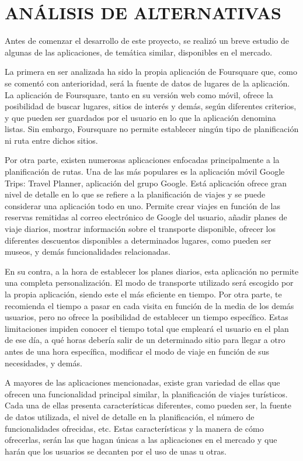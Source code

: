 \chapter[Análisis de alternativas]{
  \label{chp:analisisdealternativas}
  ANÁLISIS DE ALTERNATIVAS
}
\thispagestyle{numberingStyle}
\pagestyle{numberingStyle}



Antes de comenzar el desarrollo de este proyecto, se realizó un breve estudio de algunas de las aplicaciones, de temática similar, disponibles en el mercado. 

La primera en ser analizada ha sido la propia aplicación de Foursquare que, como se comentó con anterioridad, será la fuente de datos de lugares de la aplicación. La aplicación de Foursquare, tanto en su versión web como móvil, ofrece la posibilidad de buscar lugares, sitios de interés y demás, según diferentes criterios, y que pueden ser guardados por el usuario en lo que la aplicación denomina listas. Sin embargo, Foursquare no permite establecer ningún tipo de planificación ni ruta entre dichos sitios.

Por otra parte, existen numerosas aplicaciones enfocadas principalmente a la planificación de rutas. Una de las más populares es la aplicación móvil Google Trips: Travel Planner, aplicación del grupo Google. Está aplicación ofrece gran nivel de detalle en lo que se refiere a la planificación de viajes y se puede considerar una aplicación todo en uno. Permite crear viajes en función de las reservas remitidas al correo electrónico de Google del usuario, añadir planes de viaje diarios, mostrar información sobre el transporte disponible, ofrecer los diferentes descuentos disponibles a determinados lugares, como pueden ser museos, y demás funcionalidades relacionadas.

En su contra, a la hora de establecer los planes diarios, esta aplicación no permite una completa personalización. El modo de transporte utilizado será escogido por la propia aplicación, siendo este el más eficiente en tiempo. Por otra parte, te recomienda el tiempo a pasar en cada visita en función de la media de los demás usuarios, pero no ofrece la posibilidad de establecer un tiempo específico. Estas limitaciones impiden conocer el tiempo total que empleará el usuario en el plan de ese día, a qué horas debería salir de un determinado sitio para llegar a otro antes de una hora específica, modificar el modo de viaje en función de sus necesidades, y demás.


A mayores de las aplicaciones mencionadas, existe gran variedad de ellas que ofrecen una funcionalidad principal similar, la planificación de viajes turísticos. Cada una de ellas presenta características diferentes, como pueden ser, la fuente de datos utilizada, el nivel de detalle en la planificación, el número de funcionalidades ofrecidas, etc. Estas características y la manera de cómo ofrecerlas, serán las que hagan únicas a las aplicaciones en el mercado y que harán que los usuarios se decanten por el uso de unas u otras.












